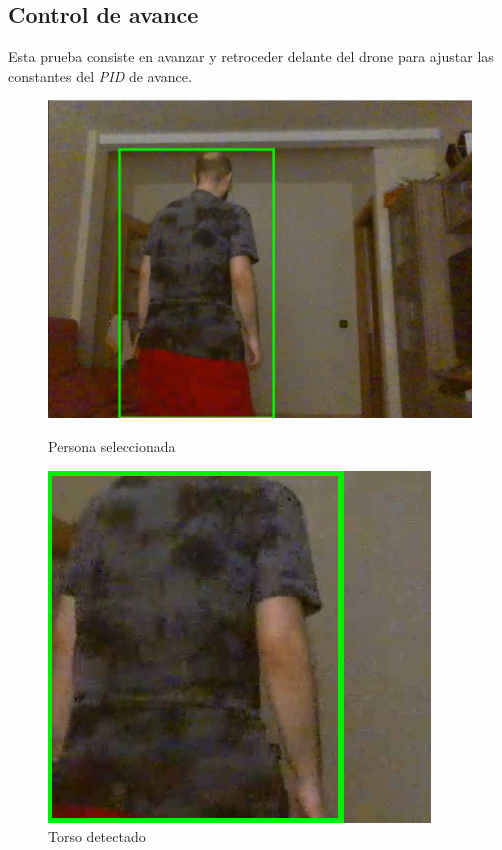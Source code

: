 \subsection*{Control de avance}
Esta prueba consiste en avanzar y retroceder delante del drone para ajustar las constantes del \textit{PID} de avance.

\begin{figure}[!htb]
    \includegraphics[width=\linewidth]{figures/real/cap1.png}
    \caption{Persona seleccionada}\label{fig:real1}
\endminipage\hfill
{}
    \includegraphics[width=\linewidth]{figures/real/cap2.png}
    \caption{Torso detectado}\label{fig:real2}
\endminipage\hfill
\end{figure}
